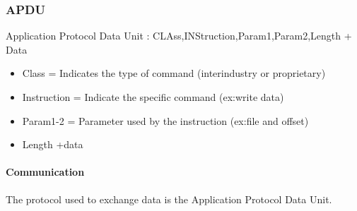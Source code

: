 \subsubsection{APDU}
Application Protocol Data Unit : CLAss,INStruction,Param1,Param2,Length + Data
\begin{itemize}
	\item Class = Indicates the type of command (interindustry or proprietary)
	\item Instruction = Indicate the specific command (ex:write data)
	\item Param1-2 = Parameter used by the instruction (ex:file and offset)
	\item Length +data

\end{itemize}


\paragraph{Communication}
The protocol used to exchange data is the Application Protocol Data Unit.


